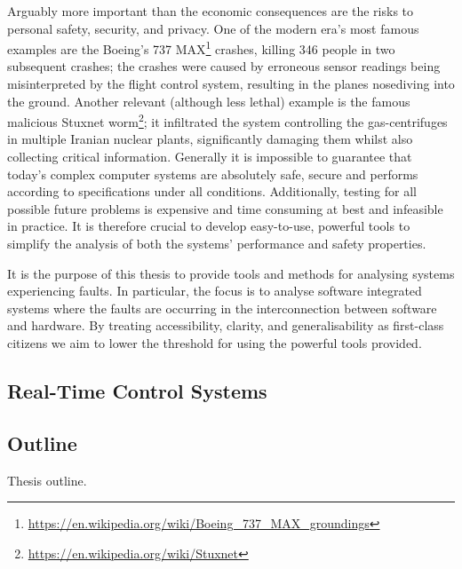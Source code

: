 Arguably more important than the economic consequences are the risks to personal safety, security, and privacy.
One of the modern era's most famous examples are the Boeing's 737 MAX\footnote{\url{https://en.wikipedia.org/wiki/Boeing_737_MAX_groundings}} crashes, killing 346 people in two subsequent crashes; the crashes were caused by erroneous sensor readings being misinterpreted by the flight control system, resulting in the planes nosediving into the ground.
Another relevant (although less lethal) example is the famous malicious Stuxnet worm\footnote{\url{https://en.wikipedia.org/wiki/Stuxnet}}; it infiltrated the system controlling the gas-centrifuges in multiple Iranian nuclear plants, significantly damaging them whilst also collecting critical information. 
Generally it is impossible to guarantee that today's complex computer systems are absolutely safe, secure and performs according to specifications under all conditions.
Additionally, testing for all possible future problems is expensive and time consuming at best and infeasible in practice.
It is therefore crucial to develop easy-to-use, powerful tools to simplify the analysis of both the systems' performance and safety properties.

It is the purpose of this thesis to provide tools and methods for analysing systems experiencing faults.
In particular, the focus is to analyse software integrated systems where the faults are occurring in the interconnection between software and hardware.
By treating accessibility, clarity, and generalisability as first-class citizens we aim to lower the threshold for using the powerful tools provided.




\subsection*{Real-Time Control Systems }%
%
\begin{figure}[t]
    \centering
    \caption{}%
    \label{fig:embedded-system}%
\end{figure}


%


\subsection*{Outline}%
%
Thesis outline.
